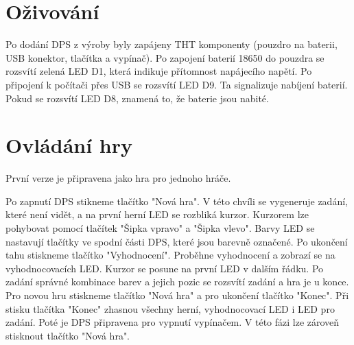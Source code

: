 \chapter{Oživování}
Po dodání DPS z výroby byly zapájeny THT komponenty (pouzdro na baterii, USB konektor, tlačítka a vypínač). Po zapojení baterií
18650 do pouzdra se rozsvítí zelená LED D1, která indikuje přítomnost napájecího napětí. Po připojení k počítači přes USB
se rozsvítí LED D9. Ta signalizuje nabíjení baterií. Pokud se rozsvítí LED D8, znamená to, že baterie jsou nabité.


\chapter{Ovládání hry}
První verze je připravena jako hra pro jednoho hráče.

Po zapnutí DPS stikneme tlačítko "Nová hra". V této chvíli se vygeneruje zadání, které není vidět,
 a na první herní LED se rozbliká kurzor. 
Kurzorem lze pohybovat pomocí tlačítek "Šipka vpravo" a "Šipka vlevo". Barvy LED se nastavují tlačítky ve spodní části DPS,
které jsou barevně označené. 
Po ukončení tahu stiskneme tlačítko "Vyhodnocení". Proběhne vyhodnocení a zobrazí se na vyhodnocovacích LED. Kurzor se posune
na první LED v dalším řádku.
Po zadání správné kombinace barev a jejich pozic se rozsvítí zadání a hra je u konce. Pro novou hru stiskneme tlačítko
"Nová hra" a pro ukončení tlačítko "Konec".
Při stisku tlačítka "Konec" zhasnou všechny herní, vyhodnocovací LED i LED pro zadání. Poté je DPS připravena pro vypnutí
vypínačem.
V této fázi lze zároveň stisknout tlačítko "Nová hra".